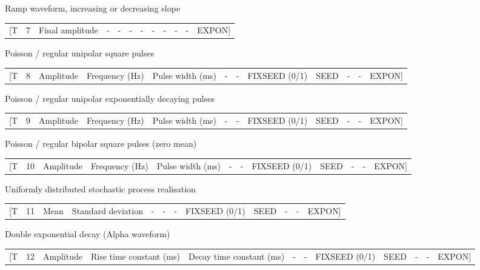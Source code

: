 \documentclass[10pt,landscape]{article}
\begin{document}
Ramp waveform, increasing or decreasing slope\\

\begin{tabular}{rrrrrrrrrrrr}
[T & 7 & Final amplitude & - & - & - & - & - & - & - & - & EXPON]
\end{tabular}


Poisson / regular unipolar square pulses\\

\begin{tabular}{rrrrrrrrrrrr}
[T & 8 & Amplitude & Frequency (Hz) & Pulse width (ms) & - & - & FIXSEED (0/1) & SEED & - & - & EXPON]
\end{tabular}


Poisson / regular unipolar exponentially decaying pulses\\

\begin{tabular}{rrrrrrrrrrrr}
[T & 9 & Amplitude & Frequency (Hz) & Pulse width (ms) & - & - & FIXSEED (0/1) & SEED & - & - & EXPON]
\end{tabular}


Poisson / regular bipolar square pulses (zero mean)\\

\begin{tabular}{rrrrrrrrrrrr}
[T & 10 & Amplitude & Frequency (Hz) & Pulse width (ms) & - & - & FIXSEED (0/1) & SEED & - & - & EXPON]
\end{tabular}


Uniformly distributed stochastic process realisation\\

\begin{tabular}{rrrrrrrrrrrr}
[T & 11 & Mean & Standard deviation & - & - & - & FIXSEED (0/1) & SEED & - & - & EXPON]
\end{tabular}


Double exponential decay (Alpha waveform)\\

\begin{tabular}{rrrrrrrrrrrr}
[T & 12 & Amplitude & Rise time constant (ms) & Decay time constant (ms) & - & - & FIXSEED (0/1) & SEED & - & - & EXPON]
\end{tabular}
\end{document}
